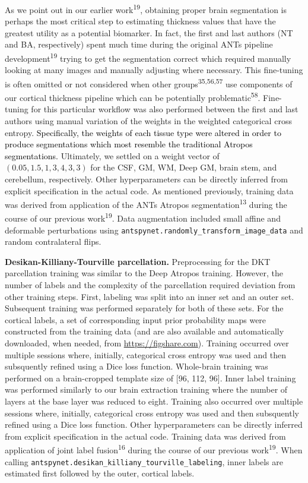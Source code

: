 \documentclass[12pt,]{article}
\begin{document}
As we point out in our earlier work\textsuperscript{19}, obtaining
proper brain segmentation is perhaps the most critical step to
estimating thickness values that have the greatest utility as a
potential biomarker. In fact, the first and last authors (NT and BA,
respectively) spent much time during the original ANTs pipeline
development\textsuperscript{19} trying to get the segmentation correct
which required manually looking at many images and manually adjusting
where necessary. This fine-tuning is often omitted or not considered
when other groups\textsuperscript{35,56,57} use components of our
cortical thickness pipeline which can be potentially
problematic\textsuperscript{58}. Fine-tuning for this particular
workflow was also performed between the first and last authors using
manual variation of the weights in the weighted categorical cross
entropy.
\textcolor{black}{Specifically, the weights of each tissue type were altered in
order to produce segmentations which most resemble the traditional Atropos segmentations.}
Ultimately, we settled on a weight vector of
\((0.05, 1.5, 1, 3, 4, 3, 3)\) for the CSF, GM, WM, Deep GM, brain stem,
and cerebellum, respectively. Other hyperparameters can be directly
inferred from explicit specification in the actual code. As mentioned
previously, training data was derived from application of the ANTs
Atropos segmentation\textsuperscript{13} during the course of our
previous work\textsuperscript{19}. Data augmentation included small
affine and deformable perturbations using
\texttt{antspynet.randomly\_transform\_image\_data} and random
contralateral flips.

\textbf{Desikan-Killiany-Tourville parcellation.} Preprocessing for the
DKT parcellation training was similar to the Deep Atropos training.
However, the number of labels and the complexity of the parcellation
required deviation from other training steps. First, labeling was split
into an inner set and an outer set. Subsequent training was performed
separately for both of these sets. For the cortical labels, a set of
corresponding input prior probability maps were constructed from the
training data (and are also available and automatically downloaded, when
needed, from \url{https://figshare.com}). Training occurred over
multiple sessions where, initially, categorical cross entropy was used
and then subsquently refined using a Dice loss function. Whole-brain
training was performed on a brain-cropped template size of {[}96, 112,
96{]}. Inner label training was performed similarly to our brain
extraction training where the number of layers at the base layer was
reduced to eight. Training also occurred over multiple sessions where,
initially, categorical cross entropy was used and then subsquently
refined using a Dice loss function. Other hyperparameters can be
directly inferred from explicit specification in the actual code.
Training data was derived from application of joint label
fusion\textsuperscript{16} during the course of our previous
work\textsuperscript{19}. When calling
\texttt{antspynet.desikan\_killiany\_tourville\_labeling}, inner labels
are estimated first followed by the outer, cortical labels.
\end{document}

